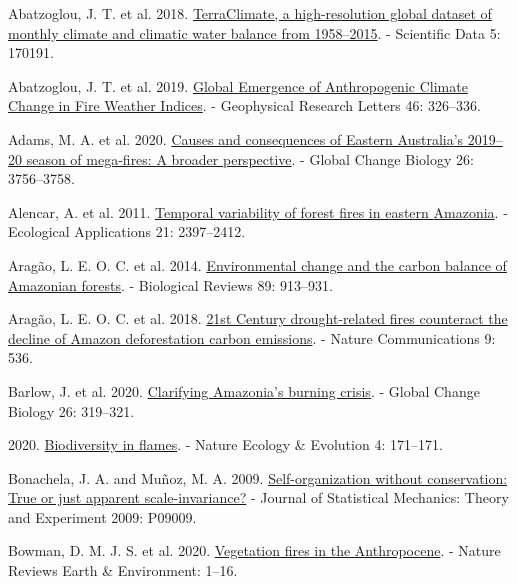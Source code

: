 \documentclass[
]{article}
\newlength{\cslhangindent}
\newenvironment{CSLReferences}[2] %
 {\begin{list}{}{%
  \setlength{\itemindent}{0pt}
  \setlength{\leftmargin}{0pt}
  \setlength{\parsep}{0pt}
  \ifodd #1
   \setlength{\leftmargin}{\cslhangindent}
   \setlength{\itemindent}{-1\cslhangindent}
  \fi
  \setlength{\itemsep}{#2\baselineskip}}}
 {\end{list}}
\begin{document}
\label{refs}
\begin{CSLReferences}{1}{1}
Abatzoglou, J. T. et al. 2018.
\href{https://doi.org/10.1038/sdata.2017.191}{{TerraClimate}, a
high-resolution global dataset of monthly climate and climatic water
balance from 1958--2015}. - Scientific Data 5: 170191.

Abatzoglou, J. T. et al. 2019.
\href{https://doi.org/10.1029/2018GL080959}{Global {Emergence} of
{Anthropogenic Climate Change} in {Fire Weather Indices}}. - Geophysical
Research Letters 46: 326--336.

Adams, M. A. et al. 2020.
\href{https://doi.org/10.1111/gcb.15125}{Causes and consequences of
{Eastern Australia}'s 2019--20 season of mega-fires: {A} broader
perspective}. - Global Change Biology 26: 3756--3758.

Alencar, A. et al. 2011.
\href{https://doi.org/10.1890/10-1168.1}{Temporal variability of forest
fires in eastern {Amazonia}}. - Ecological Applications 21: 2397--2412.

Aragão, L. E. O. C. et al. 2014.
\href{https://doi.org/10.1111/brv.12088}{Environmental change and the
carbon balance of {Amazonian} forests}. - Biological Reviews 89:
913--931.

Aragão, L. E. O. C. et al. 2018.
\href{https://doi.org/10.1038/s41467-017-02771-y}{21st {Century}
drought-related fires counteract the decline of {Amazon} deforestation
carbon emissions}. - Nature Communications 9: 536.

Barlow, J. et al. 2020.
\href{https://doi.org/10.1111/gcb.14872}{Clarifying {Amazonia}'s burning
crisis}. - Global Change Biology 26: 319--321.

2020. \href{https://doi.org/10.1038/s41559-020-1119-4}{Biodiversity in
flames}. - Nature Ecology \& Evolution 4: 171--171.

Bonachela, J. A. and Muñoz, M. A. 2009.
\href{https://doi.org/10.1088/1742-5468/2009/09/P09009}{Self-organization
without conservation: True or just apparent scale-invariance?} - Journal
of Statistical Mechanics: Theory and Experiment 2009: P09009.

Bowman, D. M. J. S. et al. 2020.
\href{https://doi.org/10.1038/s43017-020-0085-3}{Vegetation fires in the
{Anthropocene}}. - Nature Reviews Earth \& Environment: 1--16.


\end{CSLReferences}
\end{document}
